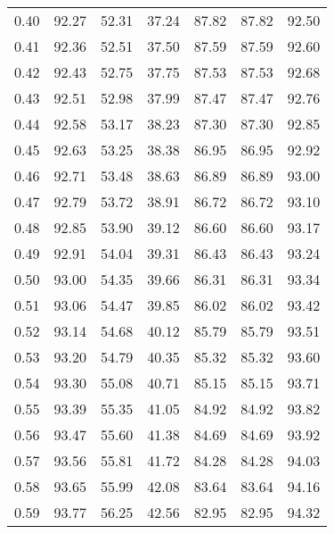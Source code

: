 \begin{tabular}{|c|c|c|c|c|c|c|}
      0.40 &     92.27 &     52.31 &      37.24 &   87.82 &      87.82 &         92.50 \\
      0.41 &     92.36 &     52.51 &      37.50 &   87.59 &      87.59 &         92.60 \\
      0.42 &     92.43 &     52.75 &      37.75 &   87.53 &      87.53 &         92.68 \\
      0.43 &     92.51 &     52.98 &      37.99 &   87.47 &      87.47 &         92.76 \\
      0.44 &     92.58 &     53.17 &      38.23 &   87.30 &      87.30 &         92.85 \\
      0.45 &     92.63 &     53.25 &      38.38 &   86.95 &      86.95 &         92.92 \\
      0.46 &     92.71 &     53.48 &      38.63 &   86.89 &      86.89 &         93.00 \\
      0.47 &     92.79 &     53.72 &      38.91 &   86.72 &      86.72 &         93.10 \\
      0.48 &     92.85 &     53.90 &      39.12 &   86.60 &      86.60 &         93.17 \\
      0.49 &     92.91 &     54.04 &      39.31 &   86.43 &      86.43 &         93.24 \\
      0.50 &     93.00 &     54.35 &      39.66 &   86.31 &      86.31 &         93.34 \\
      0.51 &     93.06 &     54.47 &      39.85 &   86.02 &      86.02 &         93.42 \\
      0.52 &     93.14 &     54.68 &      40.12 &   85.79 &      85.79 &         93.51 \\
      0.53 &     93.20 &     54.79 &      40.35 &   85.32 &      85.32 &         93.60 \\
      0.54 &     93.30 &     55.08 &      40.71 &   85.15 &      85.15 &         93.71 \\
      0.55 &     93.39 &     55.35 &      41.05 &   84.92 &      84.92 &         93.82 \\
      0.56 &     93.47 &     55.60 &      41.38 &   84.69 &      84.69 &         93.92 \\
      0.57 &     93.56 &     55.81 &      41.72 &   84.28 &      84.28 &         94.03 \\
      0.58 &     93.65 &     55.99 &      42.08 &   83.64 &      83.64 &         94.16 \\
      0.59 &     93.77 &     56.25 &      42.56 &   82.95 &      82.95 &         94.32 \\

\end{tabular}
